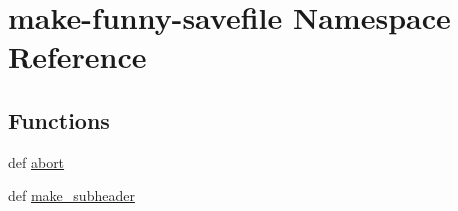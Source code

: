 \hypertarget{namespacemake-funny-savefile}{\section{make-\/funny-\/savefile Namespace Reference}
\label{namespacemake-funny-savefile}
}
\subsection*{Functions}
\begin{DoxyCompactItemize}
\item 
def \hyperlink{namespacemake-funny-savefile_a3111c661866968461132c0aca7006f24}{abort}
\item 
def \hyperlink{namespacemake-funny-savefile_aaed87108d49264902998e8dfdc4c2f53}{make\+\_\+subheader}
\end{DoxyCompactItemize}
